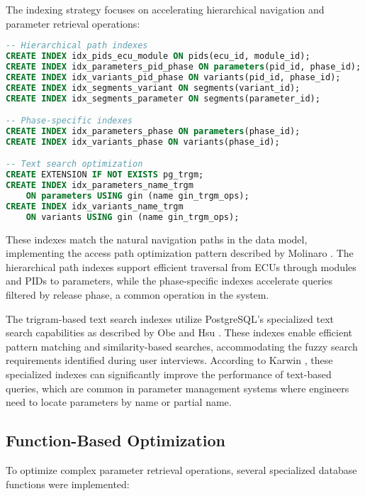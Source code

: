 The indexing strategy focuses on accelerating hierarchical navigation and parameter retrieval operations:

\begin{lstlisting}[language=SQL, caption={Core Index Implementation}, label={lst:core-indexes}]
-- Hierarchical path indexes
CREATE INDEX idx_pids_ecu_module ON pids(ecu_id, module_id);
CREATE INDEX idx_parameters_pid_phase ON parameters(pid_id, phase_id);
CREATE INDEX idx_variants_pid_phase ON variants(pid_id, phase_id);
CREATE INDEX idx_segments_variant ON segments(variant_id);
CREATE INDEX idx_segments_parameter ON segments(parameter_id);

-- Phase-specific indexes
CREATE INDEX idx_parameters_phase ON parameters(phase_id);
CREATE INDEX idx_variants_phase ON variants(phase_id);

-- Text search optimization
CREATE EXTENSION IF NOT EXISTS pg_trgm;
CREATE INDEX idx_parameters_name_trgm 
    ON parameters USING gin (name gin_trgm_ops);
CREATE INDEX idx_variants_name_trgm 
    ON variants USING gin (name gin_trgm_ops);
\end{lstlisting}

These indexes match the natural navigation paths in the data model, implementing the access path optimization pattern described by Molinaro \cite{molinaro2005sql}. The hierarchical path indexes support efficient traversal from ECUs through modules and PIDs to parameters, while the phase-specific indexes accelerate queries filtered by release phase, a common operation in the system.

The trigram-based text search indexes utilize PostgreSQL's specialized text search capabilities as described by Obe and Hsu \cite{obe2017postgresql}. These indexes enable efficient pattern matching and similarity-based searches, accommodating the fuzzy search requirements identified during user interviews. According to Karwin \cite{karwin2010sql}, these specialized indexes can significantly improve the performance of text-based queries, which are common in parameter management systems where engineers need to locate parameters by name or partial name.

\subsection{Function-Based Optimization}
\label{subsec:function-based-optimization}

To optimize complex parameter retrieval operations, several specialized database functions were implemented:

